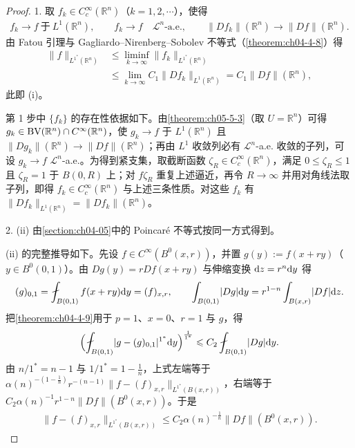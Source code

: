 ﻿\documentclass[../../main.tex]{subfiles}%
\begin{document}
\begin{proof}
1. 取 $f_k\in C_c^\infty(\mathbb{R}^n)$（$k=1,2,\cdots$），使得
\begin{align*}
f_k\to f\ \text{于}\ L^1(\mathbb{R}^n),\qquad f_k\to f\quad\mathcal{L}^n\text{-a.e.},\qquad \lVert Df_k\rVert(\mathbb{R}^n)\to\lVert Df\rVert(\mathbb{R}^n).
\end{align*}
由 Fatou 引理与 Gagliardo--Nirenberg--Sobolev 不等式（\cref{theorem:ch04-4-8}）得 %
\begin{align*}
\lVert f\rVert_{L^{1^*}(\mathbb{R}^n)}
&\leqslant\liminf_{k\to\infty}\lVert f_k\rVert_{L^{1^*}(\mathbb{R}^n)}\\
&\leqslant\lim_{k\to\infty}C_1\lVert Df_k\rVert_{L^1(\mathbb{R}^n)}=C_1\lVert Df\rVert(\mathbb{R}^n),
\end{align*}
此即 (i)。

第 1 步中 $\{f_k\}$ 的存在性依据如下。由\cref{theorem:ch05-5-3}（取 $U=\mathbb{R}^n$）可得 $g_k\in\mathrm{BV}(\mathbb{R}^n)\cap C^\infty(\mathbb{R}^n)$，使 $g_k\to f$ 于 $L^1(\mathbb{R}^n)$ 且 $\lVert Dg_k\rVert(\mathbb{R}^n)\to\lVert Df\rVert(\mathbb{R}^n)$；再由 $L^1$ 收敛列必有 $\mathcal{L}^n$-a.e. 收敛的子列，可设 $g_k\to f$ $\mathcal{L}^n$-a.e.。为得到紧支集，取截断函数 $\zeta_R\in C_c^\infty(\mathbb{R}^n)$，满足 $0\leqslant\zeta_R\leqslant1$ 且 $\zeta_R=1$ 于 $B(0,R)$ 上；对 $f\zeta_R$ 重复上述逼近，再令 $R\to\infty$ 并用对角线法取子列，即得 $f_k\in C_c^\infty(\mathbb{R}^n)$ 与上述三条性质。对这些 $f_k$ 有 $\lVert Df_k\rVert_{L^1(\mathbb{R}^n)}=\lVert Df_k\rVert(\mathbb{R}^n)$。%

2. (ii) 由\cref{section:ch04-05}中的 Poincaré 不等式按同一方式得到。%

(ii) 的完整推导如下。先设 $f\in C^\infty(B^0(x,r))$，并置 $g(y):=f(x+ry)$（$y\in B^0(0,1)$）。由 $Dg(y)=rDf(x+ry)$ 与伸缩变换 $\mathrm{d} z=r^n\mathrm{d} y$ 得
\begin{align*}
(g)_{0,1}=\fint_{B(0,1)}f(x+ry)\diff y=(f)_{x,r},\qquad
\int_{B(0,1)}\lvert Dg\rvert\diff y=r^{1-n}\int_{B(x,r)}\lvert Df\rvert\diff z .
\end{align*}
把\cref{theorem:ch04-4-9}用于 $p=1$、$x=0$、$r=1$ 与 $g$，得 %
\begin{align*}
\Bigl(\fint_{B(0,1)}\lvert g-(g)_{0,1}\rvert^{1^*}\diff y\Bigr)^{\frac{1}{1^*}}\leqslant C_2\fint_{B(0,1)}\lvert Dg\rvert\diff y .
\end{align*}
由 $n/1^*=n-1$ 与 $1/1^*=1-\frac1n$，上式左端等于 $\alpha(n)^{-\left(1-\frac1n\right)}r^{-(n-1)}\lVert f-(f)_{x,r}\rVert_{L^{1^*}(B(x,r))}$，右端等于 $C_2\alpha(n)^{-1}r^{1-n}\lVert Df\rVert(B^0(x,r))$。于是
\begin{align*}
\lVert f-(f)_{x,r}\rVert_{L^{1^*}(B(x,r))}\leqslant C_2\alpha(n)^{-\frac1n}\lVert Df\rVert(B^0(x,r)).
\end{align*}


\end{proof}
\end{document}
